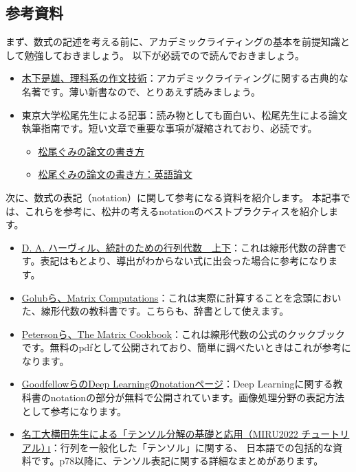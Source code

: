 \documentclass[uplatex,twocolumn,9pt,dvipdfmx]{jsarticle}
\begin{document}
\subsection{参考資料}
まず、数式の記述を考える前に、アカデミックライティングの基本を前提知識として勉強しておきましょう。
以下が必読でので読んでおきましょう。
\begin{itemize}
    \item \href{https://www.amazon.co.jp/dp/4121006240}{木下是雄、理科系の作文技術}：アカデミックライティングに関する古典的な名著です。薄い新書なので、とりあえず読みましょう。
    \item 東京大学松尾先生による記事：読み物としても面白い、松尾先生による論文執筆指南です。短い文章で重要な事項が凝縮されており、必読です。
    \begin{itemize}
        \item \href{http://ymatsuo.com/japanese/ronbun_jpn.html}{松尾ぐみの論文の書き方}
        \item \href{http://ymatsuo.com/japanese/ronbun_eng.html}{松尾ぐみの論文の書き方：英語論文}
    \end{itemize}
\end{itemize}

次に、数式の表記（notation）に関して参考になる資料を紹介します。
本記事では、これらを参考に、松井の考えるnotationのベストプラクティスを紹介します。
\begin{itemize}
    \item \href{https://www.amazon.co.jp/dp/4621061453}{D. A. ハーヴィル、統計のための行列代数　上下}：これは線形代数の辞書です。表記はもとより、導出がわからない式に出会った場合に参考になります。
    \item \href{https://www.amazon.co.jp/dp/1421407949}{Golubら、Matrix Computations}：これは実際に計算することを念頭においた、線形代数の教科書です。こちらも、辞書として使えます。
    \item \href{http://www2.imm.dtu.dk/pubdb/pubs/3274-full.html}{Petersonら、The Matrix Cookbook}：これは線形代数の公式のクックブックです。無料のpdfとして公開されており、簡単に調べたいときはこれが参考になります。
    \item \href{https://www.deeplearningbook.org/contents/notation.html}{GoodfellowらのDeep Learningのnotationページ}：Deep Learningに関する教科書のnotationの部分が無料で公開されています。画像処理分野の表記方法として参考になります。
    \item \href{https://speakerdeck.com/yokotatsuya/tensorufen-jie-falseji-chu-toying-yong-miru2022tiyutoriaru}{名工大横田先生による「テンソル分解の基礎と応用（MIRU2022 チュートリアル）」}：行列を一般化した「テンソル」に関する、
    日本語での包括的な資料です。p78以降に、テンソル表記に関する詳細なまとめがあります。
\end{itemize}
\end{document}
